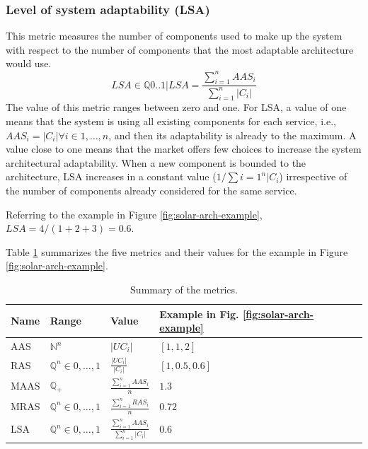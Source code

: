 \subsubsection{Level of system adaptability (LSA)}
This metric measures the number of components used to make up the system with respect to the number of components that the most adaptable architecture would use.
\[ LSA \in \mathbb{Q}{0..1} | LSA = \frac{\sum_{i=1}^{n}AAS_i}{\sum_{i=1}^{n}|C_i|} \]
The value of this metric ranges between zero and one. For LSA, a value of one means that the system is using all existing components for each service, i.e., $AAS_i = |C_i | \forall i \in {1,\dots, n}$, and then its adaptability is already to the maximum. A value close to one means that the market offers few choices to increase the system architectural adaptability. When a new component is bounded to the architecture, LSA increases in a constant value ($1/\sum{{i=1}^{n}|C_i}$) irrespective of the number of components already considered for the same service.

Referring to the example in Figure \ref{fig:solar-arch-example}, $LSA = 4/(1 + 2 + 3) = 0.6$.

Table \ref{tab:solar-metrics-summary} summarizes the five metrics and their values for the example in Figure \ref{fig:solar-arch-example}.

\begin{table}[ht!b]
	\centering
	\begin{tabular}{|l|l|l|l|}
		\hline 
		Name & Range & Value & Example in Fig. \ref{fig:solar-arch-example} \\ 
		\hline 
		AAS & $\mathbb{N}^n$ & ${|UC_i|}$ & $[1,1,2]$ \\

		RAS & $\mathbb{Q}^n \in {0,\dots,1}$ & ${\frac{|UC_i|}{|C_i|}}$ & $[1,0.5,0.6]$ \\ 

		MAAS & $\mathbb{Q}_+$ & $\frac{\sum_{i=1}^{n}AAS_i}{n}$ & $1.3$ \\ 

		MRAS & $\mathbb{Q}^n \in {0,\dots,1}$ & $\frac{\sum_{i=1}^{n}RAS_i}{n}$ & $0.72$ \\ 
		
		LSA & $\mathbb{Q}^n \in {0,\dots,1}$ & $\frac{\sum_{i=1}^{n}AAS_i}{\sum_{i=1}^{n}|C_i|}$ & $0.6$ \\
		\hline 
		
	\end{tabular} 
	\caption[SOLAR Metrics]{Summary of the metrics.\cite{solar}}
	\label{tab:solar-metrics-summary}
\end{table}


